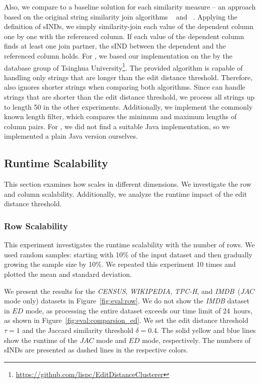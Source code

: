 Also, we compare \sawfish to a baseline solution for each similarity measure -- an approach based on the original string similarity join algorithms ~\cite{PassJoin} and ~\cite{StringSimSurvey}.
Applying the definition of sINDs, we simply similarity-join each value of the dependent column one by one with the referenced column.
If each value of the dependent column finds at least one join partner, the sIND between the dependent and the referenced column holds.
For , we based our implementation on the  by the database group of Tsinghua University\footnote{\url{https://github.com/lispc/EditDistanceClusterer}}.
The provided algorithm is capable of handling only strings that are longer than the edit distance threshold.
Therefore, \sawfish also ignores shorter strings when comparing both algorithms.
Since \sawfish can handle strings that are shorter than the edit distance threshold, we process all strings up to length 50 in the other experiments.
Additionally, we implement the commonly known length filter, which compares the minimum and maximum lengths of column pairs.
For , we did not find a suitable Java implementation, so we implemented a plain Java version ourselves.

\subsection{Runtime Scalability}
This section examines how \sawfish scales in different dimensions.
We investigate the row and column scalability.
Additionally, we analyze the runtime impact of the edit distance threshold.

\subsubsection{Row Scalability}
This experiment investigates the runtime scalability with the number of rows. 
We used random samples: starting with 10\% of the input dataset and then gradually growing the sample size by 10\%.
We repeated this experiment 10 times and plotted the mean and standard deviation.

We present the results for the \emph{CENSUS}, \emph{WIKIPEDIA}, \emph{TPC-H}, and \emph{IMDB}~($JAC$ mode only) datasets in Figure~\ref{fig:eval:row}.
We do not show the \emph{IMDB} dataset in $ED$ mode, as processing the entire dataset exceeds our time limit of 24~hours, as shown in Figure~\ref{fig:eval:comparsion_ed}.
We set the edit distance threshold $\tau=1$ and the Jaccard similarity threshold $\delta = 0.4$.
The solid yellow and blue lines show the runtime of the $JAC$ mode and $ED$ mode, respectively.
The numbers of sINDs are presented as dashed lines in the respective colors.

